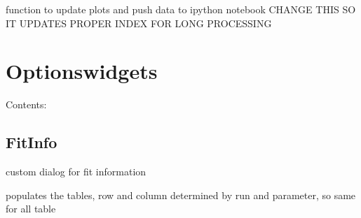 \documentclass[letterpaper,10pt,english]{sphinxmanual}
\begin{document}
\begin{fulllineitems}
\begin{fulllineitems}
\end{fulllineitems}


\begin{fulllineitems}
\label{MainWindow:SpinorMonitor.MainWindow.update_data}
function to update plots and push data to ipython notebook
CHANGE THIS SO IT UPDATES PROPER INDEX FOR LONG PROCESSING

\end{fulllineitems}


\end{fulllineitems}



\chapter{Optionswidgets}
\label{Optionswidgets:optionswidgets}\label{Optionswidgets::doc}
Contents:


\section{FitInfo}
\label{FitInfo:fitinfo}\label{FitInfo::doc}

\begin{fulllineitems}
\label{FitInfo:Optionswidgets.FitInfo}
custom dialog for fit information

\begin{fulllineitems}
\label{FitInfo:Optionswidgets.FitInfo.close}
\end{fulllineitems}


\begin{fulllineitems}
\label{FitInfo:Optionswidgets.FitInfo.parse_params}
populates the tables, row and column determined by run and
parameter, so same for all table

\end{fulllineitems}


\end{fulllineitems}
\end{document}
